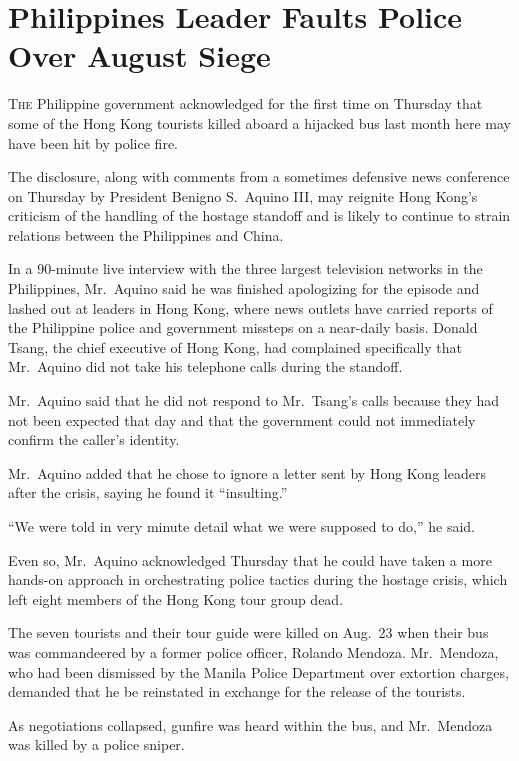 ﻿\documentclass[12pt]{article}
\begin{document}
\pagebreak
\section{Philippines Leader Faults Police Over August Siege}

\lettrine{T}{he} Philippine government acknowledged for the first time on
Thursday that some of the Hong Kong tourists killed aboard a hijacked bus last month here may have
been hit by police fire.

The disclosure, along with comments from a sometimes defensive news conference on Thursday by
President Benigno S.~Aquino III, may reignite Hong Kong's criticism of the handling of the hostage
standoff and is likely to continue to strain relations between the Philippines and China.

In a 90-minute live interview with the three largest television networks in the Philippines,
Mr.~Aquino said he was finished apologizing for the episode and lashed out at leaders in Hong Kong,
where news outlets have carried reports of the Philippine police and government missteps on a
near-daily basis. Donald Tsang, the chief executive of Hong Kong, had complained specifically that
Mr.~Aquino did not take his telephone calls during the standoff.

Mr.~Aquino said that he did not respond to Mr.~Tsang's calls because they had not been expected that
day and that the government could not immediately confirm the caller's identity.

Mr.~Aquino added that he chose to ignore a letter sent by Hong Kong leaders after the crisis, saying
he found it ``insulting.''

``We were told in very minute detail what we were supposed to do,'' he said.

Even so, Mr.~Aquino acknowledged Thursday that he could have taken a more hands-on approach in
orchestrating police tactics during the hostage crisis, which left eight members of the Hong Kong
tour group dead.

The seven tourists and their tour guide were killed on Aug.~23 when their bus was commandeered by a
former police officer, Rolando Mendoza. Mr.~Mendoza, who had been dismissed by the Manila Police
Department over extortion charges, demanded that he be reinstated in exchange for the release of the
tourists.

As negotiations collapsed, gunfire was heard within the bus, and Mr.~Mendoza was killed by a police
sniper.
\end{document}
